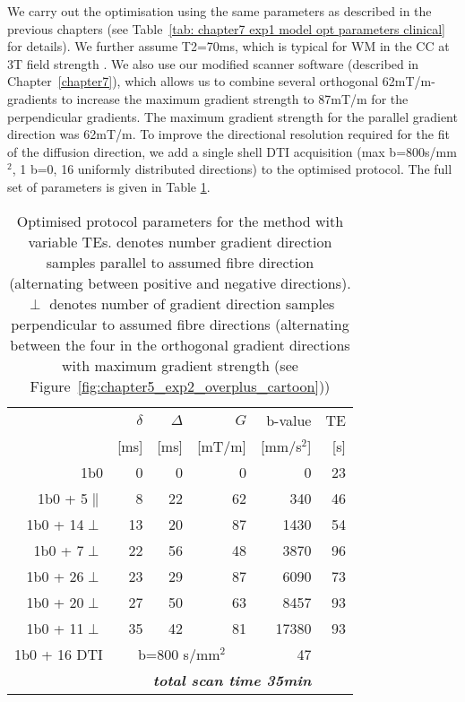 We carry out the optimisation using the same parameters as described in the previous chapters (see Table~\ref{tab: chapter7 exp1 model opt parameters clinical} for details). We further assume T2=70ms, which is typical for \gls{WM} in the \gls{CC} at 3T field strength \citep{Stanisz:2005}. We also use our modified scanner software (described in Chapter~\ref{chapter7}), which allows us to combine several orthogonal 62mT/m-gradients to increase the maximum gradient strength to 87mT/m for the perpendicular gradients. The maximum gradient strength for the parallel gradient direction was 62mT/m. To improve the directional resolution required for the fit of the diffusion direction, we add a single shell DTI acquisition (max b=800s/mm$^2$, 1 b=0, 16 uniformly distributed directions) to the optimised protocol. The full set of parameters is given in Table \ref{tab:chap9 protocol table}.

\begin{table}[htbp]
\begin{captionframe}
  \caption{Optimised protocol parameters for the \SFasym{} method with variable TEs. \parallel denotes number gradient direction samples parallel to assumed fibre direction (alternating between positive and negative directions). $\perp$ denotes number of gradient direction samples perpendicular to assumed fibre directions (alternating between the four in the orthogonal gradient directions with maximum gradient strength (see Figure~\ref{fig:chapter5_exp2_overplus_cartoon}))}
\label{tab:chap9 protocol table}%
\end{captionframe}
\begin{tableframe}
\centering
    \begin{tabular}{rrrrrr}
    \toprule
    	  & $\delta$ & $\Delta$ & $G$ & b-value & TE\\
          & [ms] & [ms] & [mT/m] & [mm/s$^2$] & [s]\\
    \midrule
    {1b0} & {0} & {0} & {0} & 0 & {23} \\
    {1b0 + 5$\parallel$} & {8} & {22} & {62} & 340 & {46} \\
    {1b0 + 14$\perp$} & {13} & {20} & {87} & 1430 & {54} \\
    {1b0 + 7$\perp$} & {22} & {56} & {48} & 3870 &{96} \\
    {1b0 + 26$\perp$} & {23} & {29} & {87} & 6090& {73} \\
    {1b0 + 20$\perp$} & {27} & {50} & {63} & 8457 & {93} \\
    {1b0 + 11$\perp$} & {35} & {42} & {81} & 17380 & {93} \\
    {1b0 + 16 DTI} & \multicolumn{3}{c}{{b=800 s/mm$^2$}} & {47} \\
    \midrule
    \multicolumn{5}{r}{\textit{\textbf{total scan time 35min}}} \\
    \bottomrule
    \end{tabular}%
\end{tableframe}
\end{table}%


